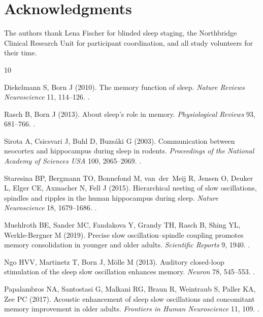 \section{Acknowledgments}

The authors thank Lena Fischer for blinded sleep staging, the Northbridge Clinical Research Unit for participant coordination, and all study volunteers for their time.

\begin{thebibliography}{10}

Diekelmann S, Born J (2010).
The memory function of sleep.
\textit{Nature Reviews Neuroscience} 11, 114--126.
.

Rasch B, Born J (2013).
About sleep's role in memory.
\textit{Physiological Reviews} 93, 681--766.
.

Sirota A, Csicsvari J, Buhl D, Buzs\'aki G (2003).
Communication between neocortex and hippocampus during sleep in rodents.
\textit{Proceedings of the National Academy of Sciences USA} 100, 2065--2069.
.

Staresina BP, Bergmann TO, Bonnefond M, van~der~Meij R, Jensen O,
Deuker L, Elger CE, Axmacher N, Fell J (2015).
Hierarchical nesting of slow oscillations, spindles and ripples in the human hippocampus during sleep.
\textit{Nature Neuroscience} 18, 1679--1686.
.

Muehlroth BE, Sander MC, Fandakova Y, Grandy TH, Rasch B, Shing YL,
Werkle-Bergner M (2019).
Precise slow oscillation--spindle coupling promotes memory consolidation in younger and older adults.
\textit{Scientific Reports} 9, 1940.
.

Ngo HVV, Martinetz T, Born J, M\"olle M (2013).
Auditory closed-loop stimulation of the sleep slow oscillation enhances memory.
\textit{Neuron} 78, 545--553.
.

Papalambros NA, Santostasi G, Malkani RG, Braun R, Weintraub S,
Paller KA, Zee PC (2017).
Acoustic enhancement of sleep slow oscillations and concomitant memory improvement in older adults.
\textit{Frontiers in Human Neuroscience} 11, 109.
.

\end{thebibliography}
